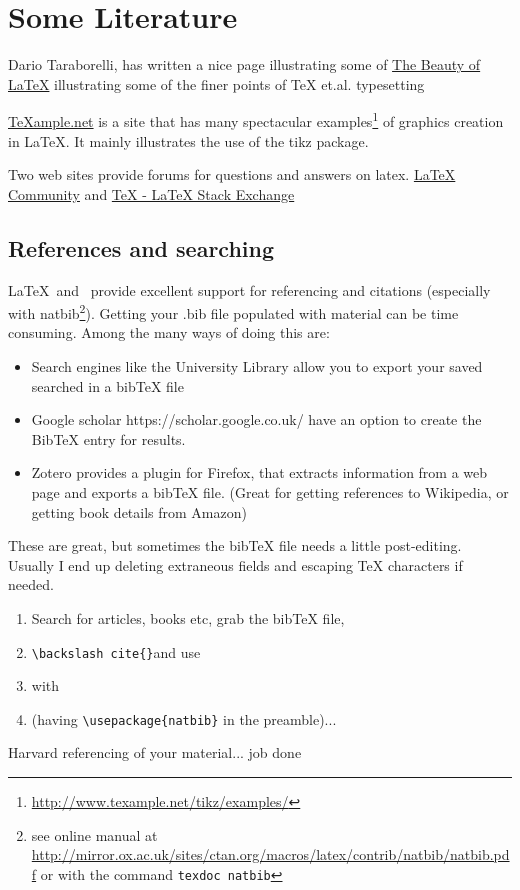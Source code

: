 
\chapter{Some Literature}

Dario Taraborelli, has written a nice page illustrating some of \href{http://nitens.org/taraborelli/latex}{The Beauty of LaTeX} illustrating some of the finer points of TeX et.al. typesetting

\url{TeXample.net} is a site that has many spectacular examples\footnote{\url{http://www.texample.net/tikz/examples/}} of graphics creation in LaTeX. It mainly illustrates the use of the tikz package.

Two web sites provide forums for questions and answers on latex. \href{http://www.latex-community.org/}{LaTeX Community} and \href{http://tex.stackexchange.com/}{TeX - LaTeX Stack Exchange}

\section{References and searching}

\LaTeX\ and \BibTeX\ provide excellent support for referencing and citations (especially with natbib\footnote{see online manual at \url{http://mirror.ox.ac.uk/sites/ctan.org/macros/latex/contrib/natbib/natbib.pdf} or with the command \texttt{texdoc natbib}}).  Getting your .bib file populated with material can be time consuming. Among the many ways of doing this are:
\begin{itemize}
\item    Search engines like the University Library allow you to export your saved searched in a bibTeX file
\item    Google scholar https://scholar.google.co.uk/ have an option to create the BibTeX entry for results.
\item    Zotero provides a plugin for Firefox, that extracts information from a web page and exports a bibTeX file. (Great for getting references to Wikipedia, or getting book details from Amazon)
\end{itemize}

These are great, but sometimes the bibTeX file needs a little post-editing. Usually I end up deleting extraneous fields and escaping TeX characters if needed.

\begin{enumerate}
\item Search for articles, books etc, grab the bibTeX file,
\item \verb"\backslash cite{}"and use
\item \verb"" with
\item \verb"" (having \verb"\usepackage{natbib}" in the preamble)...
\end{enumerate}
 Harvard referencing of your material... job done


